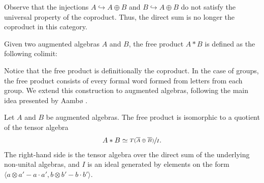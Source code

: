 \documentclass[../thesis.tex]{subfiles}
\begin{document}
                Observe that the injections $A \hookrightarrow A \oplus B$ and $B \hookrightarrow A \oplus B$ do not satisfy the universal property of the coproduct. Thus, the direct sum is no longer the coproduct in this category.

                \begin{definition}
                    Given two augmented algebras $A$ and $B$, the free product $A\ast B$ is defined as the following colimit:
                    \begin{center}
                    \end{center}
                \end{definition}
                
                Notice that the free product is definitionally the coproduct. In the case of groups, the free product consists of every formal word formed from letters from each group. We extend this construction to augmented algebras, following the main idea presented by Aambø \cite{Aambø21}.

                \begin{lemma}
                    Let $A$ and $B$ be augmented algebras. The free product is isomorphic to a quotient of the tensor algebra
                    \begin{align*}
                        A\ast B \simeq \sfrac{T(\overline{A}\oplus \overline{B})}{I}\text{.}
                    \end{align*}
                    The right-hand side is the tensor algebra over the direct sum of the underlying non-unital algebras, and $I$ is an ideal generated by elements on the form $\langle a\otimes a' - a\cdot a', b\otimes b' - b\cdot b' \rangle$.
                \end{lemma}
\end{document}
